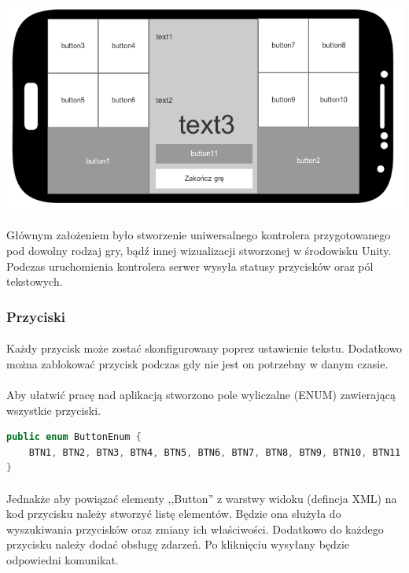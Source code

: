 \documentclass[12pt]{article}
\begin{document}
{\begin{center}
\includegraphics[width=1\textwidth]{images/button_mockup.png}
\end{center}
\paragraph{}
Głównym założeniem było stworzenie uniwersalnego kontrolera przygotowanego pod dowolny rodzaj gry, bądź innej wizualizacji stworzonej w środowisku Unity. Podczas uruchomienia kontrolera serwer wysyła statusy przycisków oraz pól tekstowych.

\subsubsection{Przyciski}
\paragraph{}
Każdy przycisk może zostać skonfigurowany poprez ustawienie tekstu. Dodatkowo można zablokować przycisk podczas gdy nie jest on potrzebny w danym czasie.
\paragraph{}
Aby ułatwić pracę nad aplikacją stworzono pole wyliczalne (ENUM) zawierającą wszystkie przyciski.

\begin{lstlisting}[language=Java]
public enum ButtonEnum {
    BTN1, BTN2, BTN3, BTN4, BTN5, BTN6, BTN7, BTN8, BTN9, BTN10, BTN11
}
\end{lstlisting}
\paragraph{}
Jednakże aby powiązać elementy ,,Button'' z warstwy widoku (defincja XML) na kod przycisku  należy stworzyć listę elementów. Będzie ona służyła do wyszukiwania przycisków oraz zmiany ich właściwości. Dodatkowo do każdego przycisku należy dodać obsługę zdarzeń. Po kliknięciu wysyłany będzie odpowiedni komunikat.

}
\end{document}
